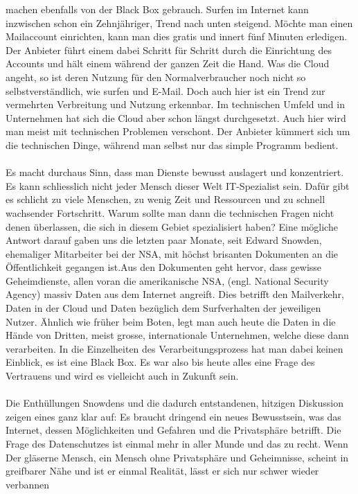 machen ebenfalls von der Black Box gebrauch. Surfen im Internet kann inzwischen schon ein Zehnjähriger, Trend nach unten steigend. Möchte man einen Mailaccount einrichten, kann man dies gratis und innert fünf Minuten erledigen. Der Anbieter führt einem dabei Schritt für Schritt durch die Einrichtung des Accounts und hält einem während der ganzen Zeit die Hand. Was die Cloud angeht, so ist deren Nutzung für den Normalverbraucher noch nicht so selbstverständlich, wie surfen und E-Mail. Doch auch hier ist ein Trend zur vermehrten Verbreitung und Nutzung erkennbar. Im technischen Umfeld und in Unternehmen hat sich die Cloud aber schon längst durchgesetzt. Auch hier wird man meist mit technischen Problemen verschont. Der Anbieter kümmert sich um die technischen Dinge, während man selbst nur das simple Programm bedient.
\\
\\
Es macht durchaus Sinn, dass man Dienste bewusst auslagert und konzentriert. Es kann schliesslich nicht jeder Mensch dieser Welt IT-Spezialist sein. Dafür gibt es schlicht zu viele Menschen, zu wenig Zeit und Ressourcen und zu schnell wachsender Fortschritt. Warum sollte man dann die technischen Fragen nicht denen überlassen, die sich in diesem Gebiet spezialisiert haben? Eine mögliche Antwort darauf gaben uns die letzten paar Monate, seit Edward Snowden, ehemaliger Mitarbeiter bei der NSA, mit höchst brisanten Dokumenten an die Öffentlichkeit gegangen ist.Aus den Dokumenten geht hervor, dass gewisse Geheimdienste, allen voran die amerikanische NSA, (engl. National Security Agency) massiv Daten aus dem Internet angreift. Dies betrifft den Mailverkehr, Daten in der Cloud und Daten bezüglich dem Surfverhalten der jeweiligen Nutzer. Ähnlich wie früher beim Boten, legt man auch heute die Daten in die Hände von Dritten, meist grosse, internationale Unternehmen, welche diese dann verarbeiten. In die Einzelheiten des Verarbeitungsprozess hat man dabei keinen Einblick, es ist eine Black Box. Es war also bis heute alles eine Frage des Vertrauens und wird es vielleicht auch in Zukunft sein.
\\
\\
Die Enthüllungen Snowdens und die dadurch entstandenen, hitzigen Diskussion zeigen eines ganz klar auf: Es braucht dringend ein neues Bewusstsein, was das Internet, dessen Möglichkeiten und Gefahren und die Privatsphäre betrifft. Die Frage des Datenschutzes ist einmal mehr in aller Munde und das zu recht. Wenn  Der gläserne Mensch, ein Mensch ohne Privatsphäre und Geheimnisse, scheint in greifbarer Nähe und ist er einmal Realität, lässt er sich nur schwer wieder verbannen
